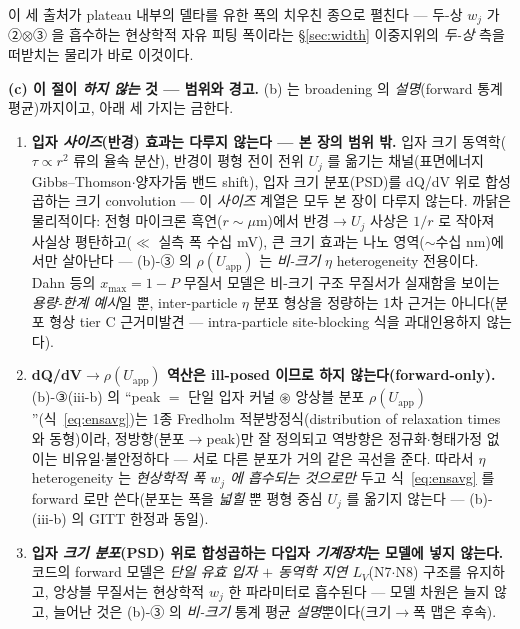 \documentclass[11pt,a4paper]{article}
\newcommand{\app}{\mathrm{app}}
\begin{document}
이 세 출처가 plateau 내부의 델타를 유한 폭의 치우친 종으로 펼친다 — 두-상 $w_j$ 가 ②$\otimes$③ 을 흡수하는
현상학적 자유 피팅 폭이라는 \S\ref{sec:width} 이중지위의 \emph{두-상} 측을 떠받치는 물리가 바로 이것이다.

\textbf{(c) 이 절이 \emph{하지 않는} 것 — 범위와 경고.} (b) 는 broadening 의 \emph{설명}(forward 통계
평균)까지이고, 아래 세 가지는 금한다.
\begin{enumerate}[label=(\roman*),leftmargin=2.2em,itemsep=2.5pt]
\item \textbf{입자 \emph{사이즈}(반경) 효과는 다루지 않는다 — 본 장의 범위 밖.} 입자 크기 동역학($\tau\!\propto\!r^2$
류의 율속 분산), 반경이 평형 전이 전위 $U_j$ 를 옮기는 채널(표면에너지 Gibbs--Thomson$\cdot$양자가둠 밴드 shift), 입자
크기 분포(PSD)를 dQ/dV 위로 합성곱하는 크기 convolution — 이 \emph{사이즈} 계열은 모두 본 장이 다루지 않는다.
까닭은 물리적이다: 전형 마이크론 흑연($r\!\sim\!\mu$m)에서 반경$\to U_j$ 사상은 $1/r$ 로 작아져 사실상
평탄하고($\ll$ 실측 폭 수십 mV), 큰 크기 효과는 나노 영역($\sim$수십 nm)에서만 살아난다 — (b)-③ 의
$\rho(U_\app)$ 는 \emph{비-크기} $\eta$ heterogeneity 전용이다. Dahn 등의 $x_{\max}=1-P$ 무질서
모델\cite{dahn1995}은 비-크기 구조 무질서가 실재함을 보이는 \emph{용량-한계 예시}일 뿐, inter-particle
$\eta$ 분포 형상을 정량하는 1차 근거는 아니다(분포 형상 tier C 근거미발견 — intra-particle site-blocking
식을 과대인용하지 않는다).
\item \textbf{dQ/dV$\to\rho(U_\app)$ 역산은 ill-posed 이므로 하지 않는다(forward-only).} (b)-③(iii-b) 의 ``peak $=$
단일 입자 커널 $\circledast$ 앙상블 분포 $\rho(U_\app)$''(식~\eqref{eq:ensavg})는 1종 Fredholm 적분방정식(distribution
of relaxation times 와 동형)이라, 정방향(분포$\to$peak)만 잘 정의되고 역방향은 정규화$\cdot$형태가정 없이는
비유일$\cdot$불안정하다 — 서로 다른 분포가 거의 같은 곡선을 준다. 따라서 $\eta$ heterogeneity 는
\emph{현상학적 폭 $w_j$ 에 흡수되는 것으로만} 두고 식~\eqref{eq:ensavg} 를 forward 로만 쓴다(분포는 폭을
\emph{넓힐} 뿐 평형 중심 $U_j$ 를 옮기지 않는다 — (b)-(iii-b) 의 GITT 한정과 동일\cite{park2021}).
\item \textbf{입자 \emph{크기 분포}(PSD) 위로 합성곱하는 다입자 \emph{기계장치}는 모델에 넣지 않는다.} 코드의
forward 모델은 \emph{단일 유효 입자 $+$ 동역학 지연 $L_V$}(N7$\cdot$N8) 구조를 유지하고, 앙상블 무질서는
현상학적 $w_j$ 한 파라미터로 흡수된다 — 모델 차원은 늘지 않고, 늘어난 것은 (b)-③ 의 \emph{비-크기} 통계
평균 \emph{설명}뿐이다(크기$\to$폭 맵은 후속).
\end{enumerate}
\end{document}

